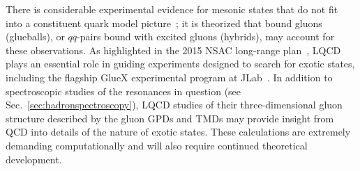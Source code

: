 
There is considerable experimental evidence for mesonic states that do not fit into a constituent quark model picture~\cite{Patrignani:2016xqp}; it is theorized that bound gluons (glueballs), or $q\overline{q}$-pairs bound with excited gluons (hybrids), may account for these observations. 
As highlighted in the 2015 NSAC long-range plan~\cite{Geesaman:2015fha}, LQCD plays an essential role in guiding experiments designed to search for exotic states, including the flagship GlueX experimental program at JLab~\cite{Dobbs:2017vjw}. In addition to spectroscopic studies of the resonances in question 
(see Sec.~\ref{sec:hadronspectroscopy}), LQCD studies of their three-dimensional gluon structure described by the gluon GPDs and TMDs may provide insight from QCD into details of the nature of exotic states. These calculations are extremely demanding computationally and will also require continued theoretical development.
